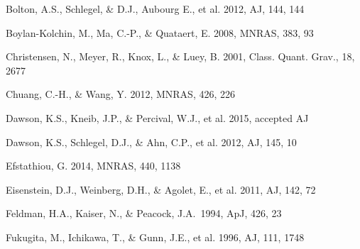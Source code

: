 \documentclass[useAMS,usenatbib]{mnras}
\begin{document}
\begin{thebibliography}{}
Bolton, A.S., Schlegel, \& D.J., Aubourg E., et al. 2012, AJ, 144, 144

Boylan-Kolchin, M., Ma, C.-P., \& Quataert, E. 2008, MNRAS, 383, 93






Christensen, N., Meyer, R., Knox, L., \& Luey, B. 2001, Class. Quant. Grav., 18, 2677


Chuang, C.-H., \& Wang, Y. 2012, MNRAS, 426, 226  



Dawson, K.S., Kneib, J.P., \& Percival, W.J., et al. 2015, accepted AJ

Dawson, K.S., Schlegel, D.J., \& Ahn, C.P., et al. 2012, AJ, 145, 10

Efstathiou, G. 2014, MNRAS, 440, 1138

Eisenstein, D.J.,  Weinberg, D.H., \& Agolet, E., et al. 2011, AJ, 142, 72

Feldman, H.A., Kaiser, N., \& Peacock, J.A.\ 1994, ApJ, 426, 23 

Fukugita, M., Ichikawa, T., \& Gunn, J.E., et al. 1996, AJ, 111, 1748



\end{thebibliography}
\end{document}
